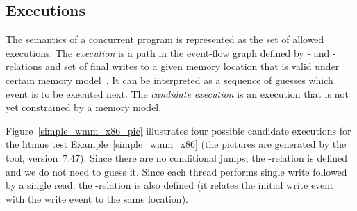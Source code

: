

\subsection{Executions}
\label{ch:wmm:model:executions}

The semantics of a concurrent program is represented as the set of allowed executions.
The \textit{execution} is a path in the event-flow graph defined by \po- and \rf-relations and set of final writes to a given memory location that is valid under certain memory model~\cite{alglave2014herding}.
It can be interpreted as a sequence of guesses which event is to be executed next.
The \textit{candidate execution} is an execution that is not yet constrained by a memory model.


Figure~\ref{simple_wmm_x86_pic} illustrates four possible candidate executions for the litmus test Example~\ref{simple_wmm_x86} (the pictures are generated by the  tool, version~7.47).
Since there are no conditional jumps, the \po-relation is defined and we do not need to guess it.
Since each thread performs single write followed by a single read, the \co-relation is also defined (it relates the initial write event with the write event to the same location).


